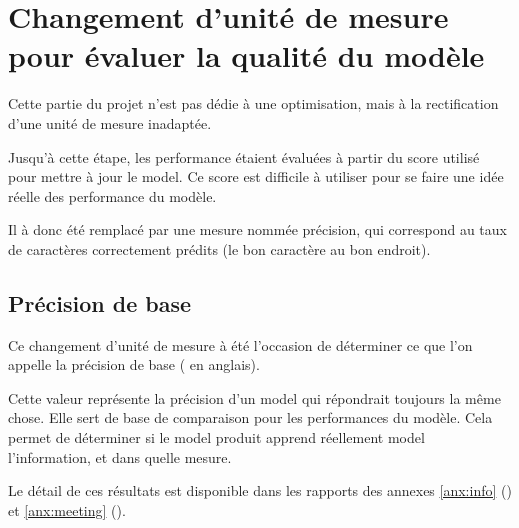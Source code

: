\section{Changement d'unité de mesure pour évaluer la qualité du modèle}
Cette partie du projet n'est pas dédie à une optimisation, mais à la rectification d'une unité de mesure inadaptée.

Jusqu'à cette étape, les performance étaient évaluées à partir du score utilisé pour mettre à jour le \gls{model}. Ce score est difficile à utiliser pour se faire une idée réelle des performance du modèle. 

Il à donc été remplacé par une mesure nommée \og précision\fg{}, qui correspond au taux de caractères correctement prédits (le bon caractère au bon endroit).

\subsection{Précision de base}
Ce changement d'unité de mesure à été l'occasion de déterminer ce que l'on appelle la précision de base ( en anglais).

Cette valeur représente la précision d'un \gls{model} qui répondrait toujours la même chose. Elle sert de base de comparaison pour les performances du modèle.
Cela permet de déterminer si le \gls{model} produit apprend réellement \gls{model} l'information, et dans quelle mesure.

Le détail de ces résultats est disponible dans les rapports des annexes \ref{anx:info} () et \ref{anx:meeting} ().
